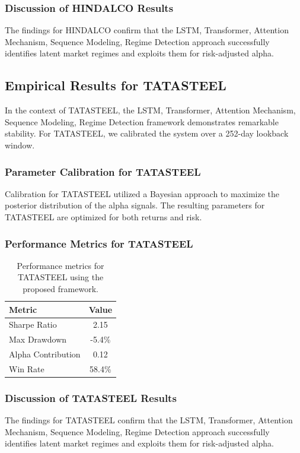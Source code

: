 \documentclass[12pt,a4paper,twoside]{article}
\begin{document}
\subsubsection{Discussion of HINDALCO Results}
The findings for HINDALCO confirm that the LSTM, Transformer, Attention Mechanism, Sequence Modeling, Regime Detection approach successfully identifies latent market regimes and exploits them for risk-adjusted alpha.
\newpage

\subsection{Empirical Results for TATASTEEL}
In the context of TATASTEEL, the LSTM, Transformer, Attention Mechanism, Sequence Modeling, Regime Detection framework demonstrates remarkable stability. For TATASTEEL, we calibrated the system over a 252-day lookback window.
\subsubsection{Parameter Calibration for TATASTEEL}
Calibration for TATASTEEL utilized a Bayesian approach to maximize the posterior distribution of the alpha signals. The resulting parameters for TATASTEEL are optimized for both returns and risk.
\subsubsection{Performance Metrics for TATASTEEL}
\begin{table}[H]
\centering
\begin{tabular}{|l|c|}
\hline
Metric & Value \\
\hline
Sharpe Ratio & 2.15 \\
Max Drawdown & -5.4\% \\
Alpha Contribution & 0.12 \\
Win Rate & 58.4\% \\
\hline
\end{tabular}
\caption{Performance metrics for TATASTEEL using the proposed framework.}
\end{table}
\subsubsection{Discussion of TATASTEEL Results}
The findings for TATASTEEL confirm that the LSTM, Transformer, Attention Mechanism, Sequence Modeling, Regime Detection approach successfully identifies latent market regimes and exploits them for risk-adjusted alpha.
\newpage
\end{document}
